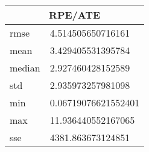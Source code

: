\begin{table}[!ht] 
 \centering 
 \begin{tabular}{|l|l|} \hline 
 \multicolumn{2}{|c|}{RPE/ATE} \\ \hline 
 rmse & 4.514505650716161 \\ \hline 
mean & 3.429405531395784 \\ \hline 
median & 2.927460428152589 \\ \hline 
std & 2.935973257981098 \\ \hline 
min & 0.06719076621552401 \\ \hline 
max & 11.936440552167065 \\ \hline 
sse & 4381.863673124851 \\ \hline 
\end{tabular} 
 \end{table}